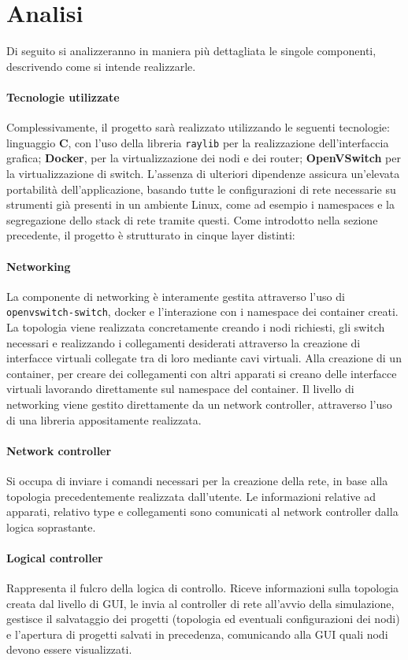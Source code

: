 \section{Analisi}
Di seguito si analizzeranno in maniera più dettagliata le singole componenti, descrivendo come si intende realizzarle. 
\paragraph*{Tecnologie utilizzate} Complessivamente, il progetto sarà realizzato utilizzando le seguenti tecnologie: linguaggio \textbf{C}, con l'uso della libreria \texttt{raylib} per la realizzazione dell'interfaccia grafica; \textbf{Docker}, per la virtualizzazione dei nodi e dei router; \textbf{OpenVSwitch} per la virtualizzazione di switch. L'assenza di ulteriori dipendenze assicura un'elevata portabilità dell'applicazione, basando tutte le configurazioni di rete necessarie su strumenti già presenti in un ambiente Linux, come ad esempio i namespaces e la segregazione dello stack di rete tramite questi. 
\newline\newline
Come introdotto nella sezione precedente, il progetto è strutturato in cinque layer distinti:
\paragraph*{Networking} La componente di networking è interamente gestita attraverso l'uso di \texttt{openvswitch-switch}, docker e l'interazione con i namespace dei container creati. La topologia viene realizzata concretamente creando i nodi richiesti, gli switch necessari e realizzando i collegamenti desiderati attraverso la creazione di interfacce virtuali collegate tra di loro mediante cavi virtuali. Alla creazione di un container, per creare dei collegamenti con altri apparati si creano delle interfacce virtuali lavorando direttamente sul namespace del container. Il livello di networking viene gestito direttamente da un network controller, attraverso l'uso di una libreria appositamente realizzata. 
\paragraph*{Network controller} Si occupa di inviare i comandi necessari per la creazione della rete, in base alla topologia precedentemente realizzata dall'utente. Le informazioni relative ad apparati, relativo type e collegamenti sono comunicati al network controller dalla logica soprastante. 
\paragraph*{Logical controller} Rappresenta il fulcro della logica di controllo. Riceve informazioni sulla topologia creata dal livello di GUI, le invia al controller di rete all'avvio della simulazione, gestisce il salvataggio dei progetti (topologia ed eventuali configurazioni dei nodi) e l'apertura di progetti salvati in precedenza, comunicando alla GUI quali nodi devono essere visualizzati. 
